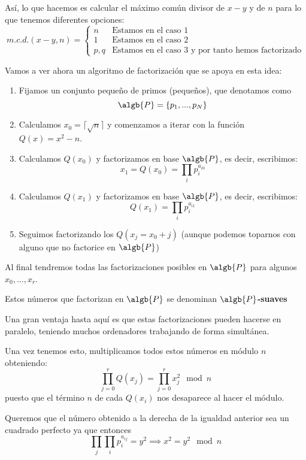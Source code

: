 Así, lo que hacemos es calcular el máximo común divisor de $x-y$ y de $n$ para lo que tenemos diferentes opciones:
\[m.c.d.(x-y,n) = \left\{ \begin{array}{ll}
             n &   \text{Estamos en el caso 1} \\
             1 &   \text{Estamos en el caso 2}\\
             p,q & \text{Estamos en el caso 3 y por tanto hemos factorizado}
             \end{array}\right.\]


Vamos a ver ahora un algoritmo de factorización que se apoya en esta idea:
\begin{mdframed}
\begin{enumerate}
\item Fijamos un conjunto pequeño de primos (pequeños), que denotamos como
\[\algb{P} = \{p_1,...,p_N\}\]

\item Calculamos $x_0=\lceil\sqrt{n}\rceil$ y comenzamos a iterar con la función $Q(x)=x^2-n$.

\item Calculamos $Q(x_0)$ y factorizamos en base $\algb{P}$, es decir, escribimos:
\[x_1 = Q(x_0) = \prod_i p_i^{a_{i0}}\]

\item Calculamos $Q(x_1)$ y factorizamos en base $\algb{P}$, es decir, escribimos:
\[Q(x_1) = \prod_i p_i^{a_{i1}}\]

\item Seguimos factorizando los $Q(x_j=x_0+j)$ (aunque podemos toparnos con alguno que no factorice en $\algb{P}$)
\end{enumerate}

Al final tendremos todas las factorizaciones posibles en $\algb{P}$ para algunos $x_0,...,x_r$.

Estos números que factorizan en $\algb{P}$ se denominan \textbf{$\algb{P}$-suaves}

\obs Una gran ventaja hasta aquí es que estas factorizaciones pueden hacerse en paralelo, teniendo muchos ordenadores trabajando de forma simultánea.

Una vez tenemos esto, multiplicamos todos estos números en módulo $n$ obteniendo:
\[\prod_{j=0}^rQ(x_j)=\prod_{j=0}^rx_j^2 \mod n\]
puesto que el término $n$ de cada $Q(x_i)$ nos desaparece al hacer el módulo.

Queremos que el número obtenido a la derecha de la igualdad anterior sea un cuadrado perfecto ya que entonces
\[\prod_j\prod_ip_i^{a_{ij}} = y^2 \implies x^2 = y^2 \mod n\]


\end{mdframed}
